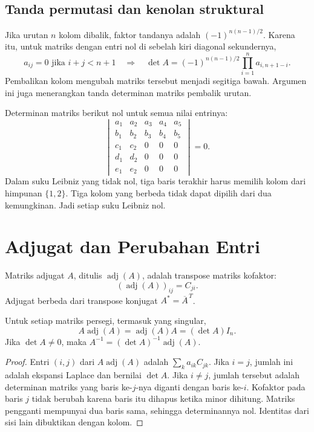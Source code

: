 \subsection{Tanda permutasi dan kenolan struktural}
Jika urutan $n$ kolom dibalik, faktor tandanya adalah
$(-1)^{n(n-1)/2}$. Karena itu, untuk matriks dengan entri nol
di sebelah kiri diagonal sekundernya,
\[
      a_{ij}=0\text{ jika }i+j<n+1
      \quad\Longrightarrow\quad
      \det A=(-1)^{n(n-1)/2}\prod_{i=1}^n a_{i,n+1-i}.
\]
Pembalikan kolom mengubah matriks tersebut menjadi segitiga bawah.
Argumen ini juga menerangkan tanda determinan matriks pembalik urutan.

\begin{exam}
      Determinan matriks berikut nol untuk semua nilai entrinya:
      \[
            \begin{vmatrix}
                  a_1 & a_2 & a_3 & a_4 & a_5 \\b_1&b_2&b_3&b_4&b_5\\
                  c_1 & c_2 & 0   & 0   & 0   \\d_1&d_2&0&0&0\\e_1&e_2&0&0&0
            \end{vmatrix}=0.
      \]
      Dalam suku Leibniz yang tidak nol, tiga baris terakhir harus memilih
      kolom dari himpunan $\{1,2\}$. Tiga kolom yang berbeda tidak dapat
      dipilih dari dua kemungkinan. Jadi setiap suku Leibniz nol.
\end{exam}

\section{Adjugat dan Perubahan Entri}
\label{det:adjugat}

\begin{defi}[Adjugat]
      Matriks adjugat $A$, ditulis $\operatorname{adj}(A)$, adalah transpose
      matriks kofaktor:
      \[
            (\operatorname{adj}(A))_{ij}=C_{ji}.
      \]
      Adjugat berbeda dari transpose konjugat $A^*=\overline A^{\,T}$.
\end{defi}

\begin{thm}
      \label{det:identitas-adj}
      Untuk setiap matriks persegi, termasuk yang singular,
      \[
            A\operatorname{adj}(A)=\operatorname{adj}(A)A=(\det A)I_n.
      \]
      Jika $\det A\ne0$, maka $A^{-1}=(\det A)^{-1}\operatorname{adj}(A)$.
\end{thm}
\begin{proof}
      Entri $(i,j)$ dari $A\operatorname{adj}(A)$ adalah
      $\sum_k a_{ik}C_{jk}$. Jika $i=j$, jumlah ini adalah ekspansi Laplace
      dan bernilai $\det A$. Jika $i\ne j$, jumlah tersebut adalah
      determinan matriks yang baris ke-$j$-nya diganti dengan baris ke-$i$.
      Kofaktor pada baris $j$ tidak berubah karena baris itu dihapus ketika
      minor dihitung. Matriks pengganti mempunyai dua baris sama, sehingga
      determinannya nol. Identitas dari sisi lain dibuktikan dengan kolom.
\end{proof}


